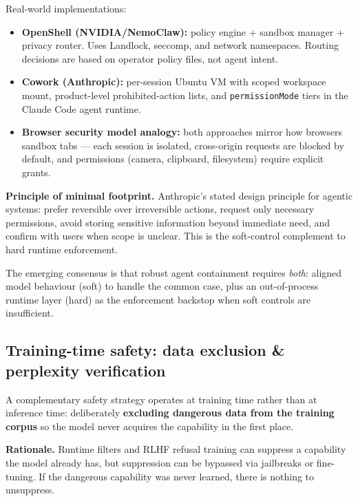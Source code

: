 Real-world implementations:
\begin{itemize}
  \item \textbf{OpenShell (NVIDIA/NemoClaw):} policy engine + sandbox manager +
    privacy router. Uses Landlock, seccomp, and network namespaces. Routing decisions
    are based on operator policy files, not agent intent.
  \item \textbf{Cowork (Anthropic):} per-session Ubuntu VM with scoped workspace
    mount, product-level prohibited-action lists, and \texttt{permissionMode} tiers in
    the Claude Code agent runtime.
  \item \textbf{Browser security model analogy:} both approaches mirror how browsers
    sandbox tabs --- each session is isolated, cross-origin requests are blocked by
    default, and permissions (camera, clipboard, filesystem) require explicit grants.
\end{itemize}

\textbf{Principle of minimal footprint.} Anthropic's stated design principle for
agentic systems: prefer reversible over irreversible actions, request only necessary
permissions, avoid storing sensitive information beyond immediate need, and confirm
with users when scope is unclear. This is the soft-control complement to hard runtime
enforcement.

The emerging consensus is that robust agent containment requires \emph{both}: aligned
model behaviour (soft) to handle the common case, plus an out-of-process runtime
layer (hard) as the enforcement backstop when soft controls are insufficient.

\subsection{Training-time safety: data exclusion \& perplexity verification}

A complementary safety strategy operates at training time rather than at inference
time: deliberately \textbf{excluding dangerous data from the training corpus} so the
model never acquires the capability in the first place.

\textbf{Rationale.} Runtime filters and RLHF refusal training can suppress a
capability the model already has, but suppression can be bypassed via jailbreaks or
fine-tuning. If the dangerous capability was never learned, there is nothing to
unsuppress.

